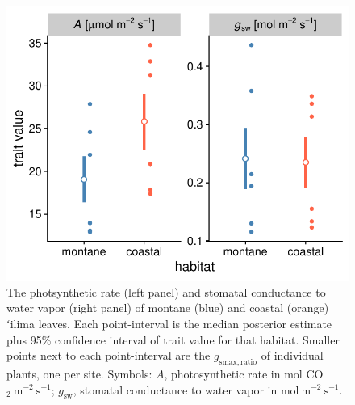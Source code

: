 \documentclass[
  letterpaper,
  DIV=11,
  numbers=noendperiod]{scrartcl}
\begin{document}
\begin{figure}
  \includegraphics{../figures/habitat-Ags.pdf}
  \caption{The photsynthetic rate (left panel) and stomatal conductance to water vapor (right panel) of montane (blue) and coastal (orange) ʻilima leaves. Each point-interval is the median posterior estimate plus 95\% confidence interval of trait value for that habitat. Smaller points next to each point-interval are the $g_\mathrm{smax,ratio}$ of individual plants, one per site. Symbols: $A$, photosynthetic rate in \textmu mol CO$_2~\text{m}^{-2}~\text{s}^{-1}$; $g_\mathrm{sw}$, stomatal conductance to water vapor in $\text{mol}~\text{m}^{-2}~\text{s}^{-1}$.}
  \label{fig:habitat-Ags}
\end{figure}

\newpage
\end{document}

